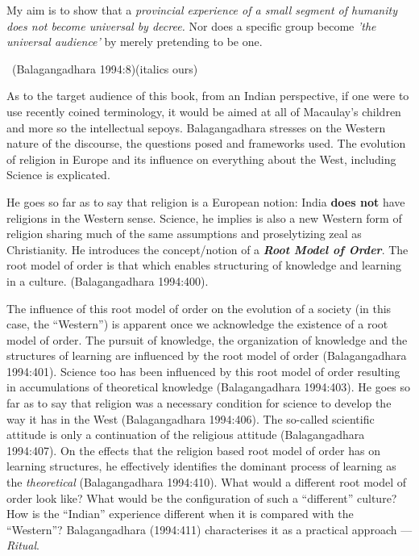 \begin{myquote}
My aim is to show that a \textit{provincial experience of a small segment of humanity does not become universal by decree.} Nor does a specific group become \textit{'the universal audience'} by merely pretending to be one. 

~\hfill (Balagangadhara 1994:8)(italics ours)
\end{myquote}

As to the target audience of this book, from an Indian perspective, if one were to use recently coined terminology, it would be aimed at all of Macaulay's children and more so the intellectual sepoys. Balagangadhara stresses on the Western nature of the discourse, the questions posed and frameworks used. The evolution of religion in Europe and its influence on everything about the West, including Science is explicated.

He goes so far as to say that religion is a European notion: India \textbf{does not} have religions in the Western sense. Science, he implies is also a new Western form of religion sharing much of the same assumptions and proselytizing zeal as Christianity. He introduces the concept/notion of a \textbf{\textit{Root Model of Order}}. The root model of order is that which enables structuring of knowledge and learning in a culture. (Balagangadhara 1994:400).

The influence of this root model of order on the evolution of a society (in this case, the “Western”) is apparent once we acknowledge the existence of a root model of order. The pursuit of knowledge, the organization of knowledge and the structures of learning are influenced by the root model of order (Balagangadhara 1994:401). Science too has been influenced by this root model of order resulting in accumulations of theoretical knowledge (Balagangadhara 1994:403). He goes so far as to say that religion was a necessary condition for science to develop the way it has in the West (Balagangadhara 1994:406). The so-called scientific attitude is only a continuation of the religious attitude (Balagangadhara 1994:407). On the effects that the religion based root model of order has on learning structures, he effectively identifies the dominant process of learning as the \textit{theoretical} (Balagangadhara 1994:410). What would a different root model of order look like? What would be the configuration of such a “different” culture? How is the “Indian” experience different when it is compared with the “Western”? Balagangadhara (1994:411) characterises it as a practical approach — \textit{Ritual}.

